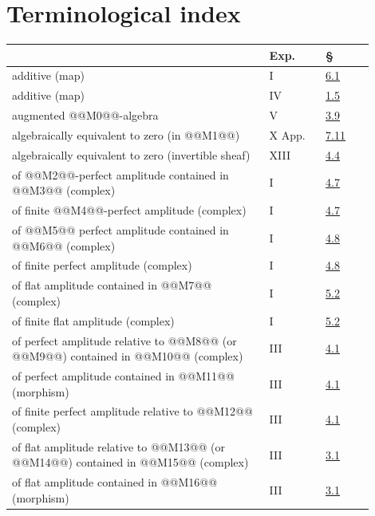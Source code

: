 
\section*{Terminological index}
\begingroup\small
\begin{longtable}{@{}>{\raggedright\arraybackslash}p{0.64\linewidth}>{\raggedright\arraybackslash}p{0.14\linewidth}>{\raggedright\arraybackslash}p{0.12\linewidth}@{}}
\toprule
 & Exp. & §\\
\midrule
additive (map) & I & \hyperlink{sga6.e01.def.6-1}{6.1}\\
additive (map) & IV & \hyperlink{sga6.e04.para.1-5}{1.5}\\
augmented @@M0@@-algebra & V & \hyperlink{sga6.e05.def.3-9}{3.9}\\
algebraically equivalent to zero (in @@M1@@) & X App. & \hyperlink{sga6.e10.para.7-11}{7.11}\\
algebraically equivalent to zero (invertible sheaf) & XIII & \hyperlink{sga6.e13.para.4-4}{4.4}\\
of @@M2@@-perfect amplitude contained in @@M3@@ (complex) & I & \hyperlink{sga6.e01.def.4-7}{4.7}\\
of finite @@M4@@-perfect amplitude (complex) & I & \hyperlink{sga6.e01.def.4-7}{4.7}\\
of @@M5@@ perfect amplitude contained in @@M6@@ (complex) & I & \hyperlink{sga6.e01.ex.4-8}{4.8}\\
of finite perfect amplitude (complex) & I & \hyperlink{sga6.e01.ex.4-8}{4.8}\\
of flat amplitude contained in @@M7@@ (complex) & I & \hyperlink{sga6.e01.def.5-2}{5.2}\\
of finite flat amplitude (complex) & I & \hyperlink{sga6.e01.def.5-2}{5.2}\\
of perfect amplitude relative to @@M8@@ (or @@M9@@) contained in @@M10@@ (complex) & III & \hyperlink{sga6.e03.def.4-1}{4.1}\\
of perfect amplitude contained in @@M11@@ (morphism) & III & \hyperlink{sga6.e03.def.4-1}{4.1}\\
of finite perfect amplitude relative to @@M12@@ (complex) & III & \hyperlink{sga6.e03.def.4-1}{4.1}\\
of flat amplitude relative to @@M13@@ (or @@M14@@) contained in @@M15@@ (complex) & III & \hyperlink{sga6.e03.def.3-1}{3.1}\\
of flat amplitude contained in @@M16@@ (morphism) & III & \hyperlink{sga6.e03.def.3-1}{3.1}\\

\end{longtable}
